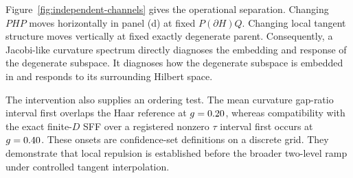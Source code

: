 Figure~\ref{fig:independent-channels} gives the operational separation.
Changing \(PHP\) moves horizontally in panel (d) at fixed
\(P(\partial H)Q\).  Changing local tangent structure moves vertically at
fixed exactly degenerate parent.  Consequently, a Jacobi-like curvature
spectrum directly diagnoses the embedding and response of the degenerate
subspace.
It diagnoses how the degenerate subspace is embedded in and responds to its
surrounding Hilbert space.

The intervention also supplies an ordering test.
The mean curvature gap-ratio interval first overlaps the Haar reference at
\(g=0.20\), whereas compatibility with the exact finite-\(D\)
SFF over a registered nonzero \(\tau\) interval first occurs at
\(g=0.40\).
These onsets are confidence-set definitions on a discrete grid.  They
demonstrate that local repulsion is established before the broader two-level
ramp under controlled tangent interpolation.
